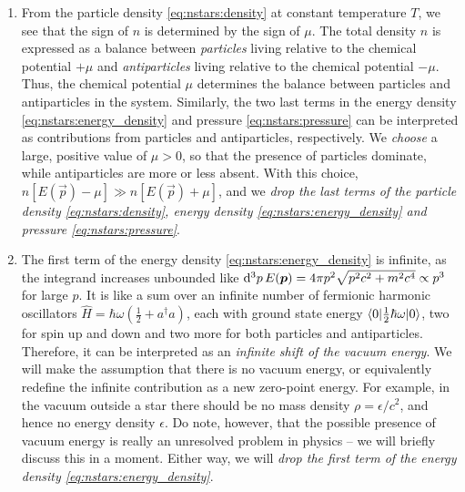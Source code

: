 \begin{enumerate}

\item
From the particle density \eqref{eq:nstars:density} at constant temperature $T$, we see that the sign of $n$ is determined by the sign of $\mu$.
The total density $n$ is expressed as a balance between \emph{particles} living relative to the chemical potential $+\mu$ and \emph{antiparticles} living relative to the chemical potential $-\mu$.
Thus, the chemical potential $\mu$ determines the balance between particles and antiparticles in the system.
Similarly, the two last terms in the energy density \eqref{eq:nstars:energy_density} and pressure \eqref{eq:nstars:pressure} can be interpreted as contributions from particles and antiparticles, respectively.
We \emph{choose} a large, positive value of $\mu > 0$, so that the presence of particles dominate, while antiparticles are more or less absent.
With this choice, $n \left[ E(\vec{p}) - \mu \right] \gg n \left[ E(\vec{p}) + \mu \right]$, and we \emph{drop the last terms of the particle density \eqref{eq:nstars:density}, energy density \eqref{eq:nstars:energy_density} and pressure \eqref{eq:nstars:pressure}}.

\item
The first term of the energy density \eqref{eq:nstars:energy_density} is infinite, as the integrand increases unbounded like $\mathop{}\!\mathrm{d}^3 p \, E({\bm{p}}) = 4 \pi p^2 \sqrt{p^2 c^2 + m^2 c^4} \propto p^3$ for large $p$.
It is like a sum over an infinite number of fermionic harmonic oscillators $\hat{H} = \hbar \omega \left( \frac12 + a^\dagger a \right)$, each with ground state energy $\braket{0 | \frac12 \hbar \omega | 0}$, two for spin up and down and two more for both particles and antiparticles.
Therefore, it can be interpreted as an \emph{infinite shift of the vacuum energy}.
We will make the assumption that there is no vacuum energy, or equivalently redefine the infinite contribution as a new zero-point energy.
For example, in the vacuum outside a star there should be no mass density $\rho = \epsilon / c^2$, and hence no energy density $\epsilon$.
Do note, however, that the possible presence of vacuum energy is really an unresolved problem in physics -- we will briefly discuss this in a moment.
Either way, we will \emph{drop the first term of the energy density \eqref{eq:nstars:energy_density}}.


\end{enumerate}
